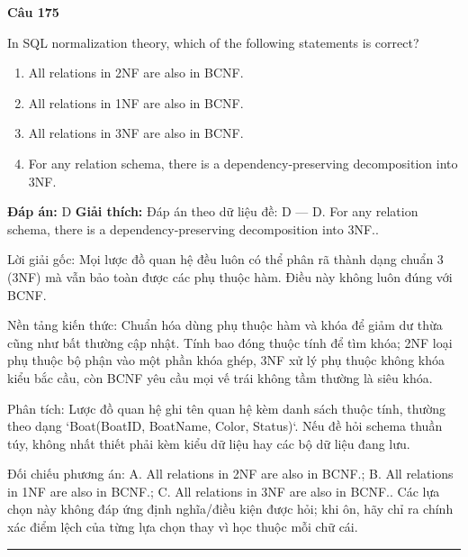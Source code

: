 \documentclass[11pt,a4paper]{article}
\newenvironment{question}[1]{%
  \par\vspace{1em}\noindent\textbf{\large Câu #1}\par\vspace{0.4em}
}{%
  \par\vspace{1em}\hrule\vspace{0.6em}
}
\newenvironment{choices}{%
  \begin{enumerate}[label=\textbf{\Alph*.},leftmargin=2.2em,itemsep=2pt,topsep=3pt]
}{%
  \end{enumerate}
}
\newcommand{\choice}{\item}
\begin{document}
\begin{question}{175}
In SQL normalization theory, which of the following statements is correct?
\begin{choices}
\choice All relations in 2NF are also in BCNF.
\choice All relations in 1NF are also in BCNF.
\choice All relations in 3NF are also in BCNF.
\choice For any relation schema, there is a dependency-preserving decomposition into 3NF.
\end{choices}
\textbf{Đáp án:} D
\textbf{Giải thích:} Đáp án theo dữ liệu đề: D — D. For any relation schema, there is a dependency-preserving decomposition into 3NF..

Lời giải gốc: Mọi lược đồ quan hệ đều luôn có thể phân rã thành dạng chuẩn 3 (3NF) mà vẫn bảo toàn được các phụ thuộc hàm. Điều này không luôn đúng với BCNF.

Nền tảng kiến thức: Chuẩn hóa dùng phụ thuộc hàm và khóa để giảm dư thừa cũng như bất thường cập nhật. Tính bao đóng thuộc tính để tìm khóa; 2NF loại phụ thuộc bộ phận vào một phần khóa ghép, 3NF xử lý phụ thuộc không khóa kiểu bắc cầu, còn BCNF yêu cầu mọi vế trái không tầm thường là siêu khóa.

Phân tích: Lược đồ quan hệ ghi tên quan hệ kèm danh sách thuộc tính, thường theo dạng `Boat(BoatID, BoatName, Color, Status)`. Nếu đề hỏi schema thuần túy, không nhất thiết phải kèm kiểu dữ liệu hay các bộ dữ liệu đang lưu.

Đối chiếu phương án: A. All relations in 2NF are also in BCNF.; B. All relations in 1NF are also in BCNF.; C. All relations in 3NF are also in BCNF.. Các lựa chọn này không đáp ứng định nghĩa/điều kiện được hỏi; khi ôn, hãy chỉ ra chính xác điểm lệch của từng lựa chọn thay vì học thuộc mỗi chữ cái.
\end{question}
\end{document}

